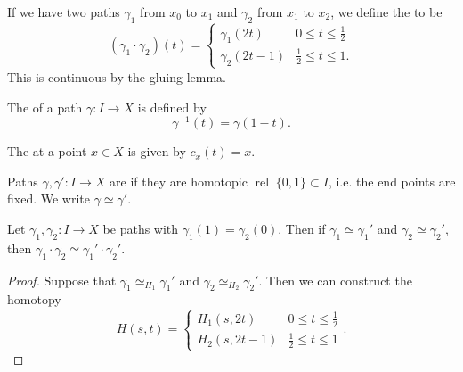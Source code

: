 \documentclass[a4paper, 10pt, twocolumn]{amsart}
\newcommand{\rel}{\operatorname{rel}}
\begin{document}
\begin{definition}
  If we have two paths $\gamma_1$ from $x_0$ to $x_1$ and $\gamma_2$ from $x_1$ to $x_2$, we define the  to be
  $$
  (\gamma_1 \cdot \gamma_2)(t) = \begin{cases}
    \gamma_1(2t) & 0 \leq t \leq \frac{1}{2}\\
    \gamma_2(2t - 1) & \frac{1}{2} \leq t \leq 1.
  \end{cases}
  $$
  This is continuous by the gluing lemma.

  The  of a path $\gamma: I \rightarrow X$ is defined by
  $$
  \gamma^{-1}(t) = \gamma(1 -t).
  $$

  The  at a point $x \in X$ is given by $c_x(t) = x$.
\end{definition}

\begin{definition}
  Paths $\gamma, \gamma': I \rightarrow X$ are  if they are homotopic $\rel\; \{0, 1 \} \subset I$, i.e. the end points are fixed. We write $\gamma \simeq \gamma'$.
\end{definition}

\begin{lemma}
  Let $\gamma_1, \gamma_2: I \rightarrow X$ be paths with $\gamma_1(1) = \gamma_2(0)$. Then if $\gamma_1 \simeq \gamma_1'$ and $\gamma_2 \simeq \gamma_2'$, then $\gamma_1 \cdot \gamma_2 \simeq \gamma_1' \cdot \gamma_2'$.
\end{lemma}
\begin{proof}
  Suppose that $\gamma_1 \simeq_{H_1} \gamma_1'$ and $\gamma_2 \simeq_{H_2} \gamma_2'$. Then we can construct the homotopy
  $$
  H(s, t)= \begin{cases}H_1(s, 2 t) & 0 \leq t \leq \frac{1}{2} \\ H_2(s, 2 t-1) & \frac{1}{2} \leq t \leq 1\end{cases}.
  $$
\end{proof}
\end{document}
